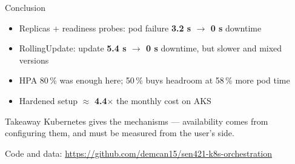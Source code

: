 \documentclass[aspectratio=169,11pt]{beamer}
\begin{document}
\begin{frame}{Conclusion}
	\begin{itemize}
		\item Replicas + readiness probes: pod failure \textbf{3.2 s $\to$ 0 s} downtime
		\item RollingUpdate: update \textbf{5.4 s $\to$ 0 s} downtime, but slower and mixed versions
		\item HPA 80\,\% was enough here; 50\,\% buys headroom at 58\,\% more pod time
		\item Hardened setup $\approx$ \textbf{4.4$\times$} the monthly cost on AKS
	\end{itemize}
	\vspace{0.5em}
	\begin{block}{Takeaway}
		Kubernetes gives the mechanisms --- availability comes from configuring them, and must be measured from the user's side.
	\end{block}
	\small Code and data: \url{https://github.com/demcan15/sen421-k8s-orchestration}
\end{frame}
\end{document}
